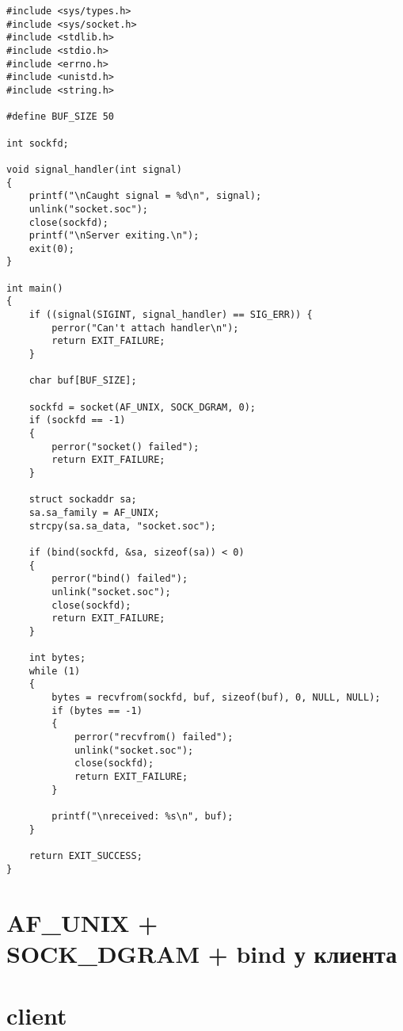 \begin{lstlisting}
#include <sys/types.h>
#include <sys/socket.h>
#include <stdlib.h>
#include <stdio.h>
#include <errno.h>
#include <unistd.h>
#include <string.h>

#define BUF_SIZE 50

int sockfd;

void signal_handler(int signal)
{
    printf("\nCaught signal = %d\n", signal);
    unlink("socket.soc");
    close(sockfd);
    printf("\nServer exiting.\n");
    exit(0);
}

int main() 
{
	if ((signal(SIGINT, signal_handler) == SIG_ERR)) {
        perror("Can't attach handler\n");
        return EXIT_FAILURE;
    }

	char buf[BUF_SIZE];

	sockfd = socket(AF_UNIX, SOCK_DGRAM, 0);
	if (sockfd == -1) 
	{
		perror("socket() failed");
        return EXIT_FAILURE;
	}

	struct sockaddr sa;
	sa.sa_family = AF_UNIX;
	strcpy(sa.sa_data, "socket.soc");

	if (bind(sockfd, &sa, sizeof(sa)) < 0) 
	{
		perror("bind() failed");
		unlink("socket.soc");
		close(sockfd);
		return EXIT_FAILURE;
	}

	int bytes;
	while (1)
	{
		bytes = recvfrom(sockfd, buf, sizeof(buf), 0, NULL, NULL);
		if (bytes == -1)
		{
			perror("recvfrom() failed");
			unlink("socket.soc");
			close(sockfd);
			return EXIT_FAILURE;
		}

		printf("\nreceived: %s\n", buf);
	}

	return EXIT_SUCCESS;
}
\end{lstlisting}

\section{AF\_UNIX + \\ SOCK\_DGRAM + bind у клиента}

\section*{client}

